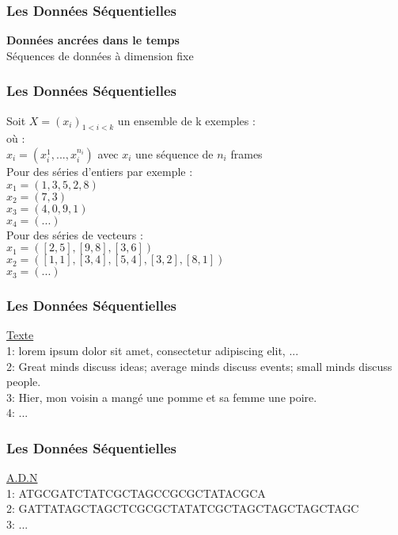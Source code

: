 \begin{frame}
  \frametitle{Les Données Séquentielles}
  \begin{center}
    \textbf{Données ancrées dans le temps} \\
    $\;$ \\
    Séquences de données à dimension fixe
  \end{center}
\end{frame}

\begin{frame}
  \frametitle{Les Données Séquentielles}
  Soit $X=(x_i)_{1<i<k}$ un ensemble de k exemples : \\
  où : \\
  $x_i = (x_{i}^1 , ... , x_{i}^{n_i})$ avec $x_i$ une séquence de $n_i$ frames \\
  \newline
  Pour des séries d'entiers par exemple : \\
  $x_1 = (1,3,5,2,8)$ \\
  $x_2 = (7,3)$ \\
  $x_3 = (4,0,9,1)$ \\
  $x_4 = (...)$ \\
  \newline
  Pour des séries de vecteurs : \\
  $x_1 = ([2,5],[9,8],[3,6])$ \\
  $x_2 = ([1,1],[3,4],[5,4],[3,2],[8,1])$ \\
  $x_3 = (...)$ 
\end{frame}

\begin{frame}
  \frametitle{Les Données Séquentielles}
  \underline{Texte} \\
  1: lorem ipsum dolor sit amet, consectetur adipiscing elit, ... \\
  2: Great minds discuss ideas; average minds discuss events; small minds discuss people. \\
  3: Hier, mon voisin a mangé une pomme et sa femme une poire. \\
  4: ...
\end{frame}

\begin{frame}
  \frametitle{Les Données Séquentielles}
  \underline{A.D.N} \\
  1: ATGCGATCTATCGCTAGCCGCGCTATACGCA \\
  2: GATTATAGCTAGCTCGCGCTATATCGCTAGCTAGCTAGCTAGC \\
  3: ...
\end{frame}

